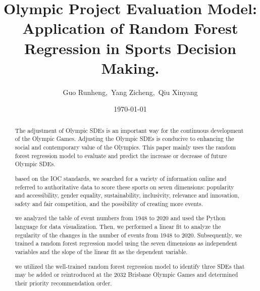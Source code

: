 \documentclass[a4paper]{article}
\title{Olympic Project Evaluation Model: Application of Random Forest Regression in Sports Decision Making.}
\author{ Guo Runheng,\ Yang Zicheng,\ Qiu Xinyang}
\date{\today}
\begin{document}
    \maketitle


\begin{abstract}
    The adjustment of Olympic SDEs is an important way for the continuous development of the Olympic Games. Adjusting the Olympic SDEs is conducive to enhancing the social and contemporary value of the Olympics. This paper mainly uses the random forest regression model to evaluate and predict the increase or decrease of future Olympic SDEs.
    \par based on the IOC standards, we searched for a variety of information online and referred to authoritative data to score these sports on seven dimensions: popularity and accessibility, gender equality, sustainability, inclusivity, relevance and innovation, safety and fair competition, and the possibility of creating more events.
    \par we analyzed the table of event numbers from 1948 to 2020 and used the Python language for data visualization. Then, we performed a linear fit to analyze the regularity of the changes in the number of events from 1948 to 2020. Subsequently, we trained a random forest regression model using the seven dimensions as independent variables and the slope of the linear fit as the dependent variable.
    \par we utilized the well-trained random forest regression model to identify three SDEs that may be added or reintroduced at the 2032 Brisbane Olympic Games and determined their priority recommendation order.
\end{abstract}
\tableofcontents
\end{document}

